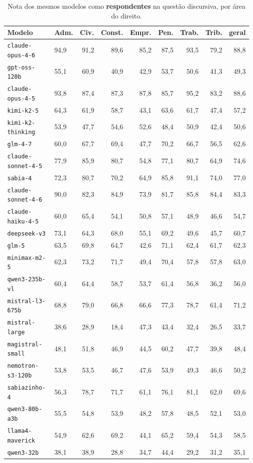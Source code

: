 \documentclass{IOS-Book-Article}
\begin{document}
\begin{table}[!ht]
\centering
\caption{Nota dos mesmos modelos como \textbf{respondentes} na questão discursiva, por área do direito.}
\footnotesize\setlength{\tabcolsep}{2pt}
\begin{tabular}{llrrrrrrr}
\hline
\textbf{Modelo} & \textbf{Adm.} & \textbf{Civ.} & \textbf{Const.} & \textbf{Empr.} & \textbf{Pen.} & \textbf{Trab.} & \textbf{Trib.} & \textbf{geral} \\
\hline
\texttt{claude-opus-4-6} & 94,9 & 91,2 & 89,6 & 85,2 & 87,5 & 93,5 & 79,2 & 88,8 \\
\texttt{gpt-oss-120b} & 55,1 & 60,9 & 40,9 & 42,9 & 53,7 & 50,6 & 41,3 & 49,3 \\
\texttt{claude-opus-4-5} & 93,8 & 87,4 & 87,3 & 87,8 & 85,7 & 95,2 & 83,2 & 88,6 \\
\texttt{kimi-k2-5} & 64,3 & 61,9 & 58,7 & 43,1 & 63,6 & 61,7 & 47,4 & 57,2 \\
\texttt{kimi-k2-thinking} & 53,9 & 47,7 & 54,6 & 52,6 & 48,4 & 50,9 & 42,4 & 50,6 \\
\texttt{glm-4-7} & 60,0 & 67,7 & 69,4 & 47,7 & 70,2 & 66,7 & 56,5 & 62,6 \\
\texttt{claude-sonnet-4-5} & 77,9 & 85,9 & 80,7 & 54,8 & 77,1 & 80,7 & 64,9 & 74,6 \\
\texttt{sabia-4} & 72,3 & 80,7 & 70,2 & 64,9 & 85,8 & 91,1 & 74,0 & 77,0 \\
\texttt{claude-sonnet-4-6} & 90,0 & 82,3 & 84,9 & 73,9 & 81,7 & 85,8 & 84,4 & 83,3 \\
\texttt{claude-haiku-4-5} & 60,0 & 65,4 & 54,1 & 50,8 & 57,1 & 48,9 & 46,6 & 54,7 \\
\texttt{deepseek-v3} & 73,1 & 64,3 & 68,0 & 55,1 & 69,2 & 49,6 & 45,7 & 60,7 \\
\texttt{glm-5} & 63,5 & 69,8 & 64,7 & 42,6 & 71,1 & 62,4 & 61,7 & 62,3 \\
\texttt{minimax-m2-5} & 62,3 & 73,2 & 71,7 & 49,4 & 70,4 & 57,8 & 57,8 & 63,0 \\
\texttt{qwen3-235b-vl} & 60,4 & 64,4 & 58,7 & 53,7 & 61,4 & 56,8 & 36,2 & 56,0 \\
\texttt{mistral-l3-675b} & 68,8 & 79,0 & 66,8 & 66,6 & 77,3 & 78,7 & 61,4 & 71,2 \\
\texttt{mistral-large} & 38,6 & 28,9 & 18,4 & 47,3 & 43,4 & 32,4 & 26,5 & 33,7 \\
\texttt{magistral-small} & 48,1 & 51,8 & 46,9 & 44,5 & 60,2 & 47,7 & 39,8 & 48,4 \\
\texttt{nemotron-s3-120b} & 53,8 & 53,5 & 46,7 & 47,6 & 53,9 & 49,3 & 46,6 & 50,2 \\
\texttt{sabiazinho-4} & 56,3 & 78,7 & 71,7 & 61,1 & 76,1 & 81,1 & 62,0 & 69,6 \\
\texttt{qwen3-80b-a3b} & 55,5 & 54,8 & 53,9 & 48,2 & 57,8 & 48,5 & 52,1 & 53,0 \\
\texttt{llama4-maverick} & 54,9 & 62,6 & 69,2 & 44,1 & 65,2 & 59,4 & 54,3 & 58,5 \\
\texttt{qwen3-32b} & 38,1 & 38,9 & 28,8 & 34,7 & 44,4 & 29,2 & 31,2 & 35,1 \\
\hline
\end{tabular}
\end{table}
\end{document}

